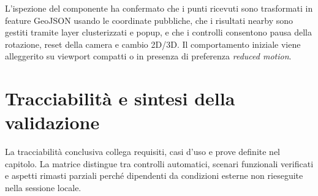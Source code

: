 L'ispezione del componente  ha confermato che i punti ricevuti sono trasformati in feature GeoJSON usando le coordinate pubbliche, che i risultati nearby sono gestiti tramite layer clusterizzati e popup, e che i controlli consentono pausa della rotazione, reset della camera e cambio 2D/3D. Il comportamento iniziale viene alleggerito su viewport compatti o in presenza di preferenza \emph{reduced motion}.



\section{Tracciabilità e sintesi della validazione}
\label{sec:tracciabilita-testing}

La tracciabilità conclusiva collega requisiti, casi d'uso e prove definite nel capitolo. La matrice distingue tra controlli automatici, scenari funzionali verificati e aspetti rimasti parziali perché dipendenti da condizioni esterne non rieseguite nella sessione locale.

